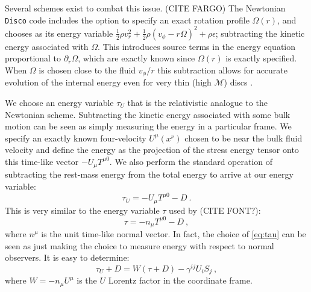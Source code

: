 \documentclass{emulateapj}
\newcommand{\eps}{\epsilon}
\newcommand{\Om}{\Omega}
\newcommand{\Mach}{\mathcal{M}}
\newcommand{\pd}{\partial}
\newcommand{\Disco}{{\texttt{Disco}}}
\begin{document}
Several schemes exist to combat this issue.  (CITE FARGO) The Newtonian \Disco{} code includes the option to specify an exact rotation profile $\Om(r)$, and chooses as its energy variable $\frac{1}{2}\rho v_r^2 + \frac{1}{2}\rho(v_\phi-r\Om)^2 + \rho \eps$; subtracting the kinetic energy associated with $\Om$. This introduces source terms in the energy equation proportional to $\pd_r \Om$, which are exactly known since $\Om(r)$ is exactly specified.  When $\Om$ is chosen close to the fluid $v_\phi / r$ this subtraction allows for accurate evolution of the internal energy even for very thin (high $\Mach$) discs \citep{Duffell16}.

We choose an energy variable $\tau_U$ that is the relativistic analogue to the Newtonian scheme.  Subtracting the kinetic energy associated with some bulk motion can be seen as simply measuring the energy in a particular frame. We specify an exactly known four-velocity $U^\mu(x^\nu)$ chosen to be near the bulk fluid velocity and define the energy as the projection of the stress energy tensor onto this time-like vector $-U_\mu T^{\mu 0}$.  We also perform the standard operation of subtracting the rest-mass energy from the total energy to arrive at our energy variable:
\begin{equation}
	\tau_U = -U_\mu T^{\mu 0} - D \ . \label{eq:tauU}
\end{equation}
This is very similar to the energy variable $\tau$ used by \citep{HARM, Duez05} (CITE FONT?):
\begin{equation}
	\tau = -n_\mu T^{\mu 0} - D \ , \label{eq:tau}
\end{equation}
where $n^\mu$ is the unit time-like normal vector. In fact, the choice of \eqref{eq:tau} can be seen as just making the choice to measure energy with respect to normal observers.  It is easy to determine: %
\begin{equation}
\tau_U + D = W\left(\tau + D\right) - \gamma^{ij}U_i S_j  \ ,
\end{equation}
where $W = -n_\mu U^\mu$ is the $U$ Lorentz factor in the coordinate frame.
\end{document}
